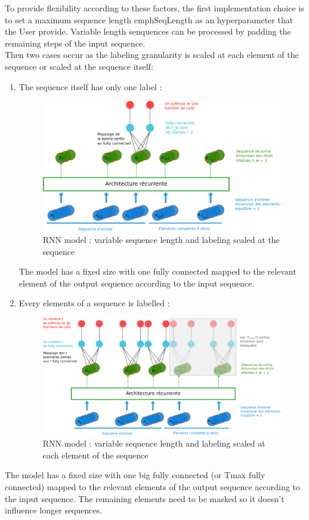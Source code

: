 \documentclass[a4paper,11pt,oneside]{article}
\begin{document}
To provide flexibility according to these factors, the first implementation choice is to set a maximum sequence length emph{SeqLength} as an hyperparameter that the User provide. Variable length senquences can be processed by padding the remaining steps of the input sequence.\\
Then two cases occur as the labeling granularity is scaled at each element of the sequence or scaled at the sequence itself:
\begin{enumerate}
\item The sequence itself has only one label :
\begin{figure}[!htb]
  \centering
  \includegraphics[width=0.8\linewidth]{figs/Tvar_P1.png}
  \caption{RNN model : variable sequence length and labeling scaled at the sequence}
  \label{fig:TvarP1}
\end{figure}
The model has a fixed size with one fully connected mapped to the relevant element of the output sequence according to the input sequence.\\
\item Every elements of a sequence is labelled :
\begin{figure}[!htb]
  \centering
  \includegraphics[width=0.8\linewidth]{figs/Tvar_Pi.png}
  \caption{RNN model : variable sequence length and labeling scaled at each element of the sequence}
  \label{fig:TvarPi}
\end{figure}
\end{enumerate}
The model has a fixed size with one big fully connected (or Tmax fully connected) mapped to the relevant elements of the output sequence according to the input sequence. The remaining elements need to be masked so it doesn't influence longer sequences.\\
\end{document}
